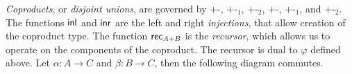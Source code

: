 \documentclass[UKenglish, 11pt, a4paper, parskip=half]{scrbook}
\begin{document}
\begin{center}
\end{center}

\textit{Coproducts}, or \textit{disjoint unions}, are governed by \( + \)-\rform, \( + \)-\rintro\({}_1\), \( + \)-\rintro\({}_2\), \( + \)-\relim, \( + \)-\rcomp\({}_1\), and \( + \)-\rcomp\({}_2\).
The functions \( {\mathsf{inl}} \) and \( {\mathsf{inr}} \) are the left and right \textit{injections}, that allow creation of the coproduct type.
The function \( \mathsf{rec}_{A + B} \) is the \textit{recursor}, which allows us to operate on the components of the coproduct.
The recursor is dual to \( \varphi \) defined above.
Let \( \alpha \colon A \to C \) and \( \beta \colon B \to C \), then the following diagram commutes.

\begin{center}
\end{center}
\end{document}

